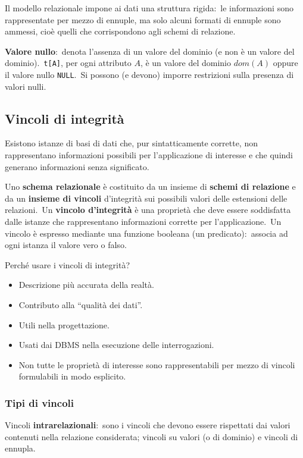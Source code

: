 Il modello relazionale impone ai dati una struttura rigida:\ le informazioni sono rappresentate per mezzo di ennuple, ma solo alcuni formati di ennuple sono ammessi, cioè quelli che corrispondono agli schemi di relazione.

\textbf{Valore nullo}:\ denota l'assenza di un valore del dominio (e non è un valore del dominio).\
\texttt{t[A]}, per ogni attributo $A$, è un valore del dominio $dom(A)$ oppure il valore nullo \texttt{NULL}.\
Si possono (e devono) imporre restrizioni sulla presenza di valori nulli.

\subsection{Vincoli di integrità}

Esistono istanze di basi di dati che, pur sintatticamente corrette, non rappresentano informazioni possibili per l'applicazione di interesse e che quindi generano informazioni senza significato.

Uno \textbf{schema relazionale} è costituito da un insieme di \textbf{schemi di relazione} e da un \textbf{insieme di vincoli} d'integrità sui possibili valori delle estensioni delle relazioni.\
Un \textbf{vincolo d'integrità} è una proprietà che deve essere soddisfatta dalle istanze che rappresentano informazioni corrette per l'applicazione.\
Un vincolo è espresso mediante una funzione booleana (un predicato):\ associa ad ogni istanza il valore vero o falso.

\noindent Perché usare i vincoli di integrità?
\begin{itemize}
	\item Descrizione più accurata della realtà.
	\item Contributo alla ``qualità dei dati''.
	\item Utili nella progettazione.
	\item Usati dai DBMS nella esecuzione delle interrogazioni.
	\item Non tutte le proprietà di interesse sono rappresentabili per mezzo di vincoli formulabili in modo esplicito.
\end{itemize}

\subsubsection{Tipi di vincoli}

Vincoli \textbf{intrarelazionali}:\ sono i vincoli che devono essere rispettati dai valori contenuti nella relazione considerata; vincoli su valori (o di dominio) e vincoli di ennupla.

